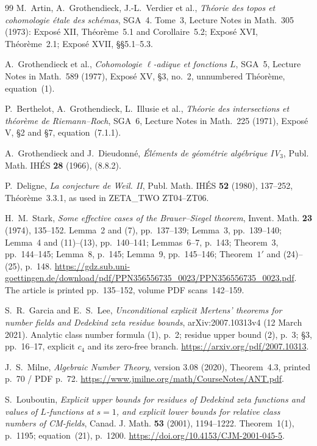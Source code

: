 \documentclass[11pt]{article}
\theoremstyle{remark}
\begin{document}
\begin{thebibliography}{99}
M.~Artin, A.~Grothendieck, J.-L.~Verdier et al.,
\emph{Th\'eorie des topos et cohomologie \'etale des sch\'emas},
SGA~4. Tome~3, Lecture Notes in Math.~305 (1973):
Expos\'e XII, Th\'eor\`eme~5.1 and Corollaire~5.2;
Expos\'e XVI, Th\'eor\`eme~2.1;
Expos\'e XVII, \S\S5.1--5.3.

A.~Grothendieck et al., \emph{Cohomologie $\ell$-adique et
fonctions $L$}, SGA~5, Lecture Notes in Math.~589 (1977),
Expos\'e XV, \S3, no.~2, unnumbered Th\'eor\`eme, equation~(1).

P.~Berthelot, A.~Grothendieck, L.~Illusie et al.,
\emph{Th\'eorie des intersections et th\'eor\`eme de Riemann--Roch},
SGA~6, Lecture Notes in Math.~225 (1971),
Expos\'e V, \S2 and \S7, equation~(7.1.1).

A.~Grothendieck and J.~Dieudonn\'e,
\emph{\'El\'ements de g\'eom\'etrie alg\'ebrique IV$_3$},
Publ. Math. IH\'ES \textbf{28} (1966), (8.8.2).

P.~Deligne, \emph{La conjecture de Weil. II},
Publ. Math. IH\'ES \textbf{52} (1980), 137--252,
Th\'eor\`eme~3.3.1, as used in ZETA\_TWO ZT04--ZT06.


 H.~M.~Stark, \emph{Some effective cases of the
Brauer--Siegel theorem}, Invent. Math. \textbf{23} (1974), 135--152.
Lemma~2 and (7), pp.~137--139; Lemma~3, pp.~139--140; Lemma~4 and
(11)--(13), pp.~140--141; Lemmas~6--7, p.~143; Theorem~3,
pp.~144--145; Lemma~8, p.~145; Lemma~9, pp.~145--146;
Theorem~$1'$ and (24)--(25), p.~148.
\url{https://gdz.sub.uni-goettingen.de/download/pdf/PPN356556735_0023/PPN356556735_0023.pdf}.
The article is printed pp.~135--152, volume PDF scans~142--159.

 S.~R.~Garcia and E.~S.~Lee,
\emph{Unconditional explicit Mertens' theorems for number fields and
Dedekind zeta residue bounds}, arXiv:2007.10313v4 (12 March 2021).
Analytic class number formula (1), p.~2; residue upper bound (2),
p.~3; \S3, pp.~16--17, explicit $c_4$ and its zero-free branch.
\url{https://arxiv.org/pdf/2007.10313}.

 J.~S.~Milne, \emph{Algebraic Number Theory},
version 3.08 (2020), Theorem~4.3, printed p.~70 / PDF p.~72.
\url{https://www.jmilne.org/math/CourseNotes/ANT.pdf}.


S.~Louboutin, \emph{Explicit upper bounds for residues of Dedekind zeta
functions and values of $L$-functions at $s=1$, and explicit lower bounds
for relative class numbers of CM-fields}, Canad. J. Math. \textbf{53}
(2001), 1194--1222. Theorem~1(1), p.~1195; equation~(21), p.~1200.
\url{https://doi.org/10.4153/CJM-2001-045-5}.


\end{thebibliography}
\end{document}
